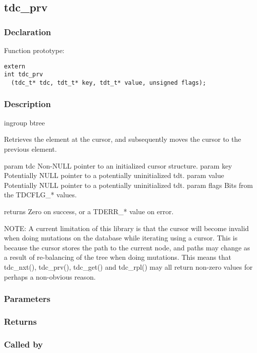
\newpage
\subsection{tdc\_prv}
\subsubsection{Declaration} Function prototype:

\begin{verbatim}
extern
int tdc_prv
  (tdc_t* tdc, tdt_t* key, tdt_t* value, unsigned flags);
\end{verbatim}

\subsubsection{Description}


 ingroup btree

 Retrieves the element at the cursor, and subsequently moves the cursor
 to the previous element.

 param tdc Non-NULL pointer to an initialized cursor structure.
 param key Potentially NULL pointer to a potentially uninitialized tdt.
 param value Potentially NULL pointer to a potentially uninitialized tdt.
 param flags Bits from the TDCFLG\_* values.

 returns Zero on success, or a TDERR\_* value on error.

 NOTE: A current limitation of this library is that the cursor will
 become invalid when doing mutations on the database while iterating
 using a cursor. This is because the cursor stores the path to the
 current node, and paths may change as a result of re-balancing of
 the tree when doing mutations. This means that tdc\_nxt(), tdc\_prv(),
 tdc\_get() and tdc\_rpl() may all return non-zero values for perhaps
 a non-obvious reason.

 

\subsubsection{Parameters}
\subsubsection{Returns}
\subsubsection{Called by}

